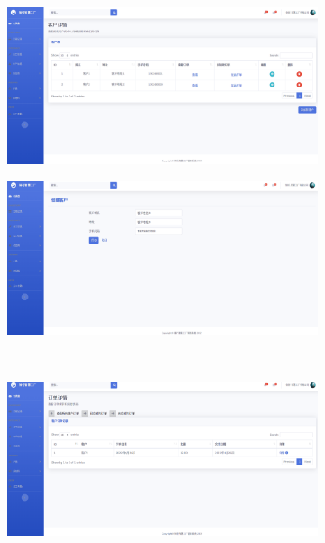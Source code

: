 \begin{figure}[H]
    \centering
    \begin{subfigure}{.35\textwidth}
        \centering
        \includegraphics[width=\textwidth]{figures/6viewallcustomer.png}
    \end{subfigure}
    \qquad
    \begin{subfigure}{.35\textwidth}
        \centering
        \includegraphics[width=\textwidth]{figures/6addnewcustomer.png}
    \end{subfigure}
    \\
    \begin{subfigure}{.35\textwidth}
        \centering
        \includegraphics[width=\textwidth]{figures/6viewallorders.png}

\end{subfigure}
\end{figure}
